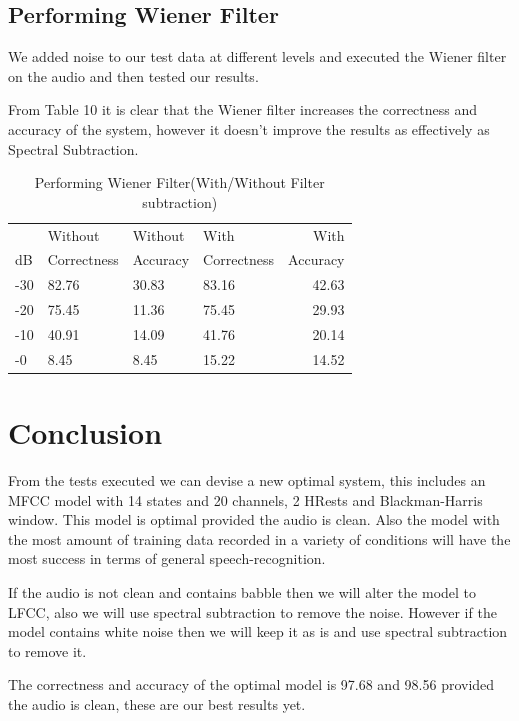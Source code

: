 \documentclass[	DIV=calc,%
							paper=a4,%
							fontsize=9.8pt,%
							twocolumn]{scrartcl}	 					%
\begin{document}
\subsection{Performing Wiener Filter}
We added noise to our test data at different levels and executed the Wiener filter on the audio and then tested our results.

From Table 10 it is clear that the Wiener filter increases the correctness and accuracy of the system, however it doesn't improve the results as effectively as Spectral Subtraction.

\begin{table}[h]
	\caption{Performing Wiener Filter(With/Without Filter subtraction)}
	\begin{tabular}{llllr}
		
		\cmidrule(r){1-5}
		\centering  & Without & Without & With & With\\
		dB &  Correctness &  Accuracy &  Correctness  & Accuracy  \\
		\midrule
		-30 & 82.76 & 30.83 & 83.16 & 42.63\\
		-20 & 75.45 & 11.36 & 75.45 & 29.93 \\
		-10 & 40.91 & 14.09 & 41.76 & 20.14 \\
		-0 & 8.45 & 8.45 & 15.22 & 14.52 \\
		
		
	\end{tabular}
\end{table}


\section{Conclusion}
From the tests executed we can devise a new optimal system, this includes an MFCC model with 14 states and 20 channels, 2 HRests and  Blackman-Harris window. This model is optimal provided the audio is clean. Also the model with the most amount of training data recorded in a variety of conditions will have the most success in terms of general speech-recognition.

If the audio is not clean and contains babble then we will alter the model to LFCC, also we will use spectral subtraction to remove the noise. However if the model contains white noise then we will keep it as is and use spectral subtraction to remove it.

The correctness and accuracy of the optimal model is 97.68 and 98.56 provided the audio is clean, these are our best results yet.




\clearpage
{}

\end{document}
